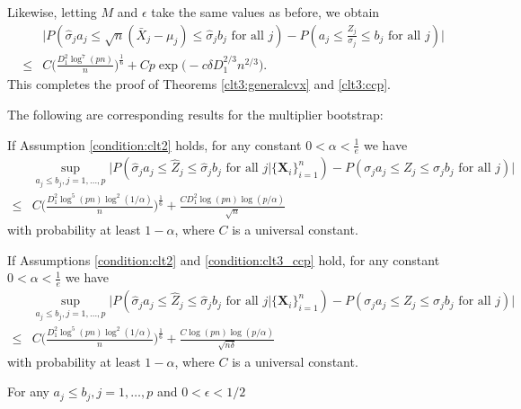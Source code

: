\documentclass[mnsc,blindrev]{informs4} %
\begin{document}
Likewise, letting $M$ and $\epsilon$ take the same values as before, we obtain
\begin{align*}
&\big\lvert P(\hat\sigma_ja_j\leq \sqrt n(\bar{X}_j-\mu_j)\leq\hat\sigma_j b_j\text{ for all }j)-P(a_j\leq \frac{Z_j}{\sigma_j}\leq b_j\text{ for all }j)\big\rvert\\
\leq &C\Big(\frac{D_1^2\log^7(pn)}{n}\Big)^{\frac{1}{6}}+Cp\exp\Big(-c\delta D_1^{2/3} n^{2/3}\Big).
\end{align*}
This completes the proof of Theorems \ref{clt3:generalcvx} and \ref{clt3:ccp}.\hfill\Halmos

The following are corresponding results for the multiplier bootstrap:
\begin{theorem}\label{plugin3:general_cvx}
If Assumption \ref{condition:clt2} holds, for any constant $0<\alpha<\frac{1}{e}$ we have
\begin{align*}
&\sup_{a_j\leq b_j,j=1,\ldots,p}\Big\lvert P(\hat\sigma_ja_j\leq \widehat{Z}_j\leq \hat\sigma_jb_j\text{ for all }j\vert \{\mathbf X_i\}_{i=1}^n)-P(\sigma_ja_j\leq Z_j\leq \sigma_jb_j\text{ for all }j)\Big\rvert\\
\leq &C\Big(\frac{D_1^2\log^5(pn)\log^2(1/\alpha)}{n}\Big)^{\frac{1}{6}}+\frac{CD_1^2\log(pn)\log(p/\alpha)}{\sqrt n}
\end{align*}
with probability at least $1-\alpha$, where $C$ is a universal constant.
\end{theorem}
\begin{theorem}\label{plugin3:ccp}
If Assumptions \ref{condition:clt2} and \ref{condition:clt3_ccp} hold, for any constant $0<\alpha<\frac{1}{e}$ we have
\begin{align*}
&\sup_{a_j\leq b_j,j=1,\ldots,p}\Big\lvert P(\hat\sigma_ja_j\leq \widehat{Z}_j\leq \hat\sigma_jb_j\text{ for all }j\vert \{\mathbf X_i\}_{i=1}^n)-P(\sigma_ja_j\leq Z_j\leq \sigma_jb_j\text{ for all }j)\Big\rvert\\
\leq &C\Big(\frac{D_1^2\log^5(pn)\log^2(1/\alpha)}{n}\Big)^{\frac{1}{6}}+\frac{C\log(pn)\log(p/\alpha)}{\sqrt{n\delta}}
\end{align*}
with probability at least $1-\alpha$, where $C$ is a universal constant.
\end{theorem}
 For any $a_j\leq b_j,j=1,\ldots,p$ and $0<\epsilon<1/2$
\end{document}
